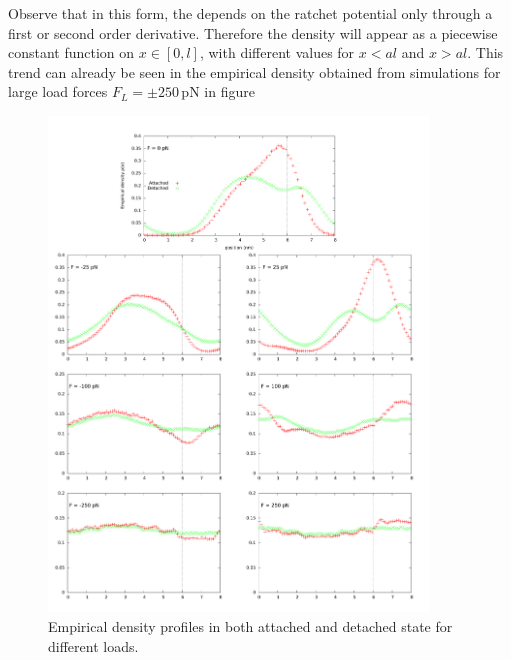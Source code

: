 \documentclass[aps,pre,twocolumn,showpacs,showkeys,a4paper]{revtex4}
\begin{document}
Observe that in this form, the depends on the ratchet potential only through a first or second order derivative. 
Therefore the density will appear as a piecewise constant function on $x\in[0,l]$, with different values for $x < a l$ and $x > a l $. 
This trend can already be seen in the empirical density obtained from simulations for large load forces $F_L = \pm 250 \, \mathrm{pN}$ in figure %
\begin{figure}[p]
\centering
\includegraphics[width=0.9\textwidth,height=!]{pos_multiplot}
\caption{Empirical density profiles in both attached and detached state for different loads.}
\label{Fig: pos_multiplot}
\end{figure}
\end{document}
